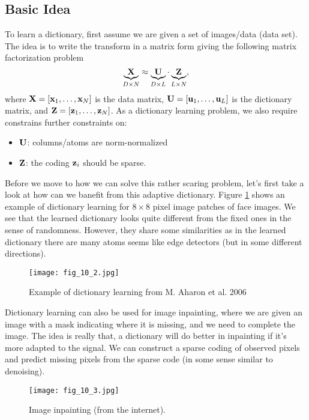 \documentclass[../main.tex]{subfiles}
\begin{document}
\subsection{Basic Idea}
To learn a dictionary, first assume we are given a set of images/data (data set).  The idea is to write the transform in a matrix form giving the following matrix factorization problem
\begin{equation}
\underbrace{\bf X}_{D\times N}\approx \underbrace{\bf U}_{D\times L}\cdot \underbrace{\bf Z}_{L\times N},
\end{equation} 
where ${\bf X}=[{\bf x}_1,\dots,{\bf x}_N]$ is the data matrix, ${\bf U}=[{\bf u}_1,\dots,{\bf u}_L]$ is the dictionary matrix, and ${\bf Z}=[{\bf z}_1,\dots,{\bf z}_N]$. As a dictionary learning problem, we also require constrains further constraints on:
\begin{itemize}
	\item ${\bf U}$: columns/atoms are norm-normalized
	\item ${\bf Z}$: the coding ${\bf z}_i$ should be sparse.
\end{itemize}
Before we move to how we can solve this rather scaring problem, let's first take a look at how can we banefit from this adaptive dictionary. Figure \ref{fig_10_2} shows an example of dictionary learning for $8\times 8$ pixel image patches of face images. We see that the learned dictionary looks quite different from the fixed ones in the sense of randomness. However, they share some similarities as in the learned dictionary there are many atoms seems like edge detectors (but in some different directions).
\begin{figure}[h] 
	\centering 
	\texttt{[image: fig\_10\_2.jpg]} 
	\caption{Example of dictionary learning from M. Aharon et al. 2006}\label{fig_10_2}
\end{figure}
\par Dictionary learning can also be used for image inpainting, where we are given an image with a mask indicating where it is missing, and we need to complete the image. The idea is really that, a dictionary will do better in inpainting if it's more adapted to the signal. We can construct a sparse coding of observed pixels and predict missing pixels from the sparse code (in some sense similar to denoising).
\begin{figure}[h] 
	\centering 
	\texttt{[image: fig\_10\_3.jpg]} 
	\caption{Image inpainting (from the internet).}\label{fig_10_3}
\end{figure}
\end{document}
